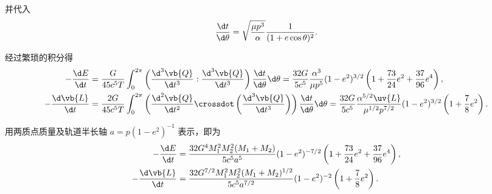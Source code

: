 \begin{notes}
并代入
\begin{equation*}
	\frac{\d t}{\d \theta} = \sqrt{\frac{\mu p^3}{\alpha}} \frac{1}{(1 + e\cos\theta)^2}.
\end{equation*}

经过繁琐的积分得
\begin{equation*}
	\begin{aligned}
	-\frac{\d E}{\d t} &= \frac{G}{45 c^5 T} \int_{0}^{2\pi} \left( \frac{\d^3\vb{Q}}{\d t^3} : \frac{\d^3\vb{Q}}{\d t^3} \right) \frac{\d t}{\d \theta} \d \theta
	= \frac{32 G}{5 c^5} \frac{\alpha^3}{\mu p^5} (1 - e^2)^{3/2} \left( 1 + \frac{73}{24}e^2 + \frac{37}{96}e^4 \right), \\
	-\frac{\d \vb{L}}{\d t} &= \frac{2 G}{45 c^5 T} \int_{0}^{2\pi} \left( \frac{\d^2\vb{Q}}{\d t^2} \crossdot \left( \frac{\d^3\vb{Q}}{\d t^3} \right) \right) \frac{\d t}{\d \theta} \d \theta
	= \frac{32 G}{5 c^5} \frac{\alpha^{5/2} \uv{L}}{\mu^{1/2} p^{7/2}} (1 - e^2)^{3/2} \left( 1 + \frac{7}{8}e^2 \right).
	\end{aligned}
\end{equation*}

用两质点质量及轨道半长轴 \(a = p(1-e^2)^{-1}\) 表示，即为
\begin{equation*}
	\begin{aligned}
	-\frac{\d E}{\d t} &= \frac{32 G^4 M_1^2 M_2^2 (M_1 + M_2)}{5 c^5 a^5} (1 - e^2)^{-7/2} \left( 1 + \frac{73}{24}e^2 + \frac{37}{96}e^4 \right), \\
	-\frac{\d \vb{L}}{\d t} &= \frac{32 G^{7/2} M_1^2 M_2^2 (M_1 + M_2)^{1/2}}{5 c^5 a^{7/2}} (1 - e^2)^{-2} \left( 1 + \frac{7}{8}e^2 \right).
	\end{aligned}
\end{equation*}
\end{notes}
